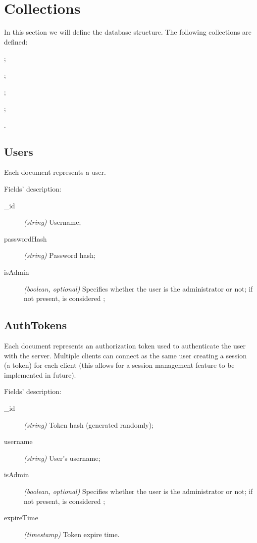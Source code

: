 \section{Collections}\label{sec:collections}

In this section we will define the database structure. The following collections
are defined:
\begin{enumerate*}[label=]
	\item {};
	\item {};
	\item {};
	\item {};
	\item {}.
\end{enumerate*}

\subsection{Users}



Each document represents a user.

Fields' description:
\begin{description}
	\item[\_id] \textit{(string)} Username;
	\item[passwordHash] \textit{(string)} Password hash;
	\item[isAdmin] \textit{(boolean, optional)} Specifies whether the user
		is the administrator or not; if not present, is considered
		;
\end{description}

\subsection{AuthTokens}



Each document represents an authorization token used to authenticate the user
with the server. Multiple clients can connect as the same user creating a
session (a token) for each client (this allows for a session management feature
to be implemented in future).

Fields' description:
\begin{description}
	\item[\_id] \textit{(string)} Token hash (generated randomly);
	\item[username] \textit{(string)} User's username;
	\item[isAdmin] \textit{(boolean, optional)} Specifies whether the user
		is the administrator or not; if not present, is considered
		;
	\item[expireTime] \textit{(timestamp)} Token expire time.
\end{description}

